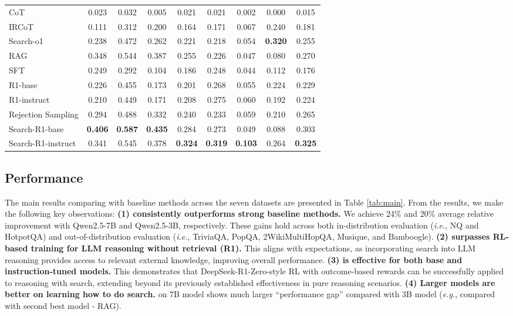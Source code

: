 \begin{table}[t]
\begin{tabular}{lcccccccc}
        CoT & 0.023 & 0.032 & 0.005 & 0.021 & 0.021 & 0.002 & 0.000 & 0.015 \\
        IRCoT & 0.111 & 0.312 & 0.200 & 0.164 & 0.171 & 0.067 & 0.240 & 0.181 \\
        Search-o1 & 0.238 & 0.472 & 0.262 & 0.221 & 0.218 & 0.054 & \textbf{0.320} & 0.255 \\
        RAG & 0.348 & 0.544 & 0.387 & 0.255 & 0.226 & 0.047 & 0.080 & 0.270  \\
        SFT & 0.249 & 0.292 & 0.104 & 0.186 & 0.248 & 0.044 & 0.112 & 0.176  \\
        R1-base & 0.226 & 0.455 & 0.173 & 0.201 & 0.268 & 0.055 & 0.224 & 0.229  \\
        R1-instruct & 0.210 & 0.449 & 0.171 & 0.208 & 0.275 & 0.060 & 0.192 & 0.224  \\
        Rejection Sampling & 0.294 & 0.488 & 0.332 & 0.240 & 0.233 & 0.059 & 0.210 & 0.265 \\
        \hdashline
        Search-R1-base & \textbf{0.406} & \textbf{0.587} & \textbf{0.435} & 0.284 & 0.273 & 0.049 & 0.088 & 0.303  \\
        Search-R1-instruct & 0.341 & 0.545 & 0.378 & \textbf{0.324} & \textbf{0.319} & \textbf{0.103} & 0.264 & \textbf{0.325}  \\
        \bottomrule
    \end{tabular}
\end{table}

\subsection{Performance}

The main results comparing \Ours with baseline methods across the seven datasets are presented in Table \ref{tab:main}. From the results, we make the following key observations:
\textbf{(1) \Ours consistently outperforms strong baseline methods.} We achieve 24\% and 20\% average relative improvement with Qwen2.5-7B and Qwen2.5-3B, respectively. These gains hold across both in-distribution evaluation (\textit{i.e.}, NQ and HotpotQA) and out-of-distribution evaluation (\textit{i.e.}, TriviaQA, PopQA, 2WikiMultiHopQA, Musique, and Bamboogle).
\textbf{(2) \Ours surpasses RL-based training for LLM reasoning without retrieval (R1).} This aligns with expectations, as incorporating search into LLM reasoning provides access to relevant external knowledge, improving overall performance.
\textbf{(3) \Ours is effective for both base and instruction-tuned models.} This demonstrates that DeepSeek-R1-Zero-style RL with outcome-based rewards \citep{guo2025deepseek} can be successfully applied to reasoning with search, extending beyond its previously established effectiveness in pure reasoning scenarios.
\textbf{(4) Larger models are better on learning how to do search.} \Ours on 7B model shows much larger ``performance gap'' compared with 3B model (\textit{e.g.}, compared with second best model - RAG).

